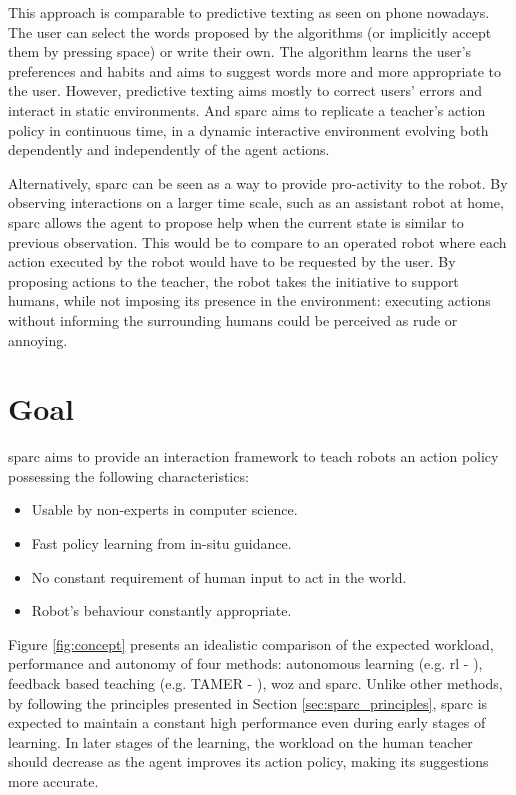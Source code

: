 This approach is comparable to predictive texting as seen on phone nowadays. The user can select the words proposed by the algorithms (or implicitly accept them by pressing space) or write their own. The algorithm learns the user's preferences and habits and aims to suggest words more and more appropriate to the user. However, predictive texting aims mostly to correct users' errors and interact in static environments. And \gls{sparc} aims to replicate a teacher's action policy in continuous time, in a dynamic interactive environment evolving both dependently and independently of the agent actions.

Alternatively, \gls{sparc} can be seen as a way to provide pro-activity to the robot. By observing interactions on a larger time scale, such as an assistant robot at home, \gls{sparc} allows the agent to propose help when the current state is similar to previous observation. This would be to compare to an operated robot where each action executed by the robot would have to be requested by the user. By proposing actions to the teacher, the robot takes the initiative to support humans, while not imposing its presence in the environment: executing actions without informing the surrounding humans could be perceived as rude or annoying.

\section{Goal}

\gls{sparc} aims to provide an interaction framework to teach robots an action policy possessing the following characteristics:
\begin{itemize}
	\item Usable by non-experts in computer science.
	\item Fast policy learning from in-situ guidance.
	\item No constant requirement of human input to act in the world.
	\item Robot's behaviour constantly appropriate.
\end{itemize}

Figure \ref{fig:concept} presents an idealistic comparison of the expected workload, performance and autonomy of four methods: autonomous learning (e.g. \gls{rl} - \citealt{sutton1998reinforcement}), feedback based teaching (e.g. TAMER - \citealt{knox2009interactively}), \gls{woz} and \gls{sparc}. Unlike other methods, by following the principles presented in Section \ref{sec:sparc_principles}, \gls{sparc} is expected to maintain a constant high performance even during early stages of learning. In later stages of the learning, the workload on the human teacher should decrease as the agent improves its action policy, making its suggestions more accurate.

